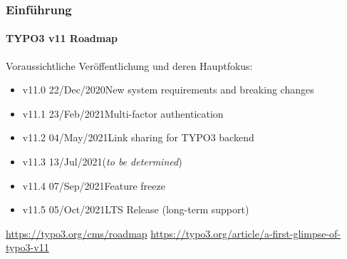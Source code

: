 %

\begin{frame}[fragile]
	\frametitle{Einführung}
	\framesubtitle{TYPO3 v11 Roadmap}

	Voraussichtliche Veröffentlichung und deren Hauptfokus:

	\begin{itemize}
		\item v11.0 \tabto{1.1cm}22/Dec/2020\tabto{3.4cm}New system requirements and breaking changes
		\item v11.1 \tabto{1.1cm}23/Feb/2021\tabto{3.4cm}Multi-factor authentication
		\item
			\begingroup
				\color{typo3orange}
				v11.2 \tabto{1.1cm}04/May/2021\tabto{3.4cm}Link sharing for TYPO3 backend
			\endgroup
		\item v11.3 \tabto{1.1cm}13/Jul/2021\tabto{3.4cm}(\textit{to be determined})
		\item v11.4 \tabto{1.1cm}07/Sep/2021\tabto{3.4cm}Feature freeze
		\item v11.5 \tabto{1.1cm}05/Oct/2021\tabto{3.4cm}LTS Release (long-term support)
	\end{itemize}

	\smaller
		\url{https://typo3.org/cms/roadmap}\newline
		\url{https://typo3.org/article/a-first-glimpse-of-typo3-v11}
	\normalsize

\end{frame}

